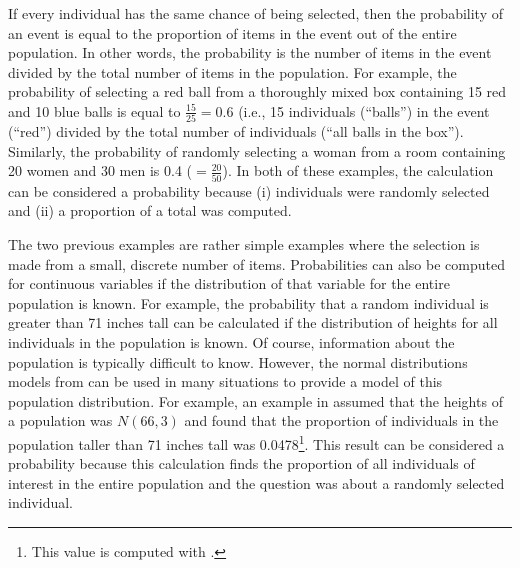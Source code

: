 \documentclass[10pt,openany]{book}\usepackage[]{graphicx}\usepackage[]{color}
\begin{document}

If every individual has the same chance of being selected, then the probability of an event is equal to the proportion of items in the event out of the entire population.  In other words, the probability is the number of items in the event divided by the total number of items in the population.  For example, the probability of selecting a red ball from a thoroughly mixed box containing 15 red and 10 blue balls is equal to $\frac{15}{25}=0.6$ (i.e., 15 individuals (``balls'') in the event (``red'') divided by the total number of individuals (``all balls in the box'').  Similarly, the probability of randomly selecting a woman from a room containing 20 women and 30 men is 0.4 ($=\frac{20}{50}$).  In both of these examples, the calculation can be considered a probability because (i) individuals were randomly selected and (ii) a proportion of a total was computed.


The two previous examples are rather simple examples where the selection is made from a small, discrete number of items.  Probabilities can also be computed for continuous variables if the distribution of that variable for the entire population is known.  For example, the probability that a random individual is greater than 71 inches tall can be calculated if the distribution of heights for all individuals in the population is known.  Of course, information about the population is typically difficult to know.  However, the normal distributions models from  can be used in many situations to provide a model of this population distribution.  For example, an example in  assumed that the heights of a population was $N(66,3)$ and found that the proportion of individuals in the population taller than 71 inches tall was 0.0478\footnote{This value is computed with .}.  This result can be considered a probability because this calculation finds the proportion of all individuals of interest in the entire population and the question was about a randomly selected individual.

\end{document}
